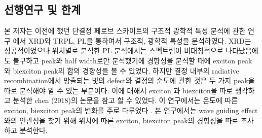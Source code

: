 \subsection{선행연구 및 한계}
본 저자는 이전에 했던 단결정 페로브 스카이트의 구조적 광학적 특성 분석에 관한 연구 에서 XRD와 TRPL, PL을 통하여서 구조적, 광학적 특성을 분석하였다. XRD는 성공적이었으나 위치별로 분석한 PL 분석에서는 스펙트럼이 비대칭적으로 나타났음에도 불구하고 peak와 half width로만 분석했기에 경향성을 분석할 때에 exciton peak 와 biexciton peak의 합의 경향성을 볼 수 있었다. 하지만 결정 내부의 radiative recombination에서 방출되는 빛의 defect와 결정의 순도에 관한 것은 두 가지 peak을 따로 분석해야 알 수 있는 부분이다. 이에 대해서 exciton 과 biexciton을 따로 생각하고 분석한 chen (2018)의 논문을 참고 할 수 있었다. 이 연구에서는 온도에 따른 exciton, biexciton peak의 변화를 주로 다루었다 \cite{chen2018room}. 본 연구에서는 wave guiding effect 와의 연관성을 찾기 위해 위치에 따른 exciton, biexciton peak의 경향성을 따로 조사하고 분석한다.
